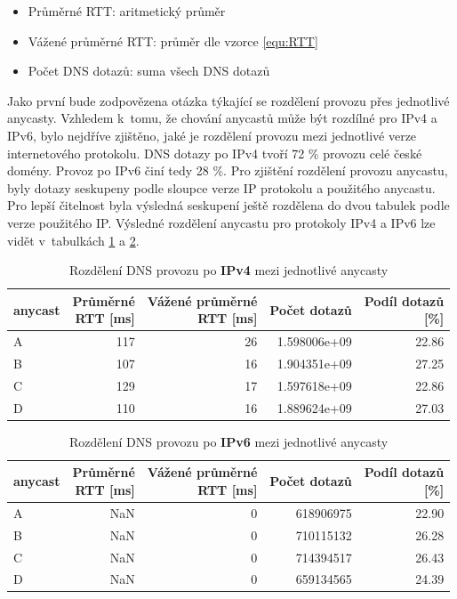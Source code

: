 \documentclass[thesis=M,czech]{src/FITthesis}[2019/12/23]
\begin{document}
\begin{itemize}
	\item Průměrné RTT: aritmetický průměr
	\item Vážené průměrné RTT: průměr dle vzorce \ref{equ:RTT}
	\item Počet DNS dotazů: suma všech DNS dotazů
\end{itemize}

Jako první bude zodpovězena otázka týkající se rozdělení provozu přes jednotlivé anycasty.
Vzhledem k~tomu, že chování anycastů může být rozdílné pro IPv4 a IPv6, bylo nejdříve zjištěno, jaké je rozdělení provozu mezi jednotlivé verze internetového protokolu. DNS dotazy po IPv4 tvoří 72 \% provozu celé české domény. Provoz po IPv6 činí tedy 28 \%. Pro zjištění rozdělení provozu anycastu, byly dotazy seskupeny podle sloupce verze IP protokolu a použitého anycastu. Pro lepší čitelnost byla výsledná seskupení ještě rozdělena do dvou tabulek podle verze použitého IP. Výsledné rozdělení anycastu pro protokoly IPv4 a IPv6 lze vidět v~tabulkách \ref{tab:anycast4} a \ref{tab:anycast6}.

\begin{table}
\centering
\begin{tabular}{lrrrr}
\toprule
{anycast} &  \makecell{Průměrné\\RTT [ms]} &  \makecell{Vážené průměrné\\RTT [ms]} &  Počet dotazů &  \makecell{Podíl dotazů\\\ [\%]} \\
\midrule
A~& 117 & 26 &  1.598006e+09 & 22.86 \\
B & 107 & 16 &  1.904351e+09 & 27.25 \\
C & 129 & 17 &  1.597618e+09 & 22.86 \\
D & 110 & 16 &  1.889624e+09 & 27.03 \\
\bottomrule
\end{tabular}
 	\caption[]{Rozdělení DNS provozu po \textbf{IPv4} mezi jednotlivé anycasty} 
 	\label{tab:anycast4}
\end{table}

\begin{table}
\centering
\begin{tabular}{lrrrr}
\toprule
{anycast} &  \makecell{Průměrné\\RTT [ms]} &  \makecell{Vážené průměrné\\RTT [ms]} &  Počet dotazů &  \makecell{Podíl dotazů\\\ [\%]} \\
\midrule
A~& NaN & 0 & 618906975 & 22.90 \\
B & NaN & 0 & 710115132 & 26.28 \\
C & NaN & 0 & 714394517 & 26.43 \\
D & NaN & 0 & 659134565 & 24.39 \\

\bottomrule
\end{tabular}
 	\caption[]{Rozdělení DNS provozu po \textbf{IPv6} mezi jednotlivé anycasty} 
 	\label{tab:anycast6}
\end{table}
\end{document}
